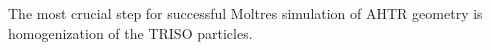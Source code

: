 The most crucial step for successful Moltres simulation of \gls{AHTR} geometry 
is homogenization of the \gls{TRISO} particles. 




